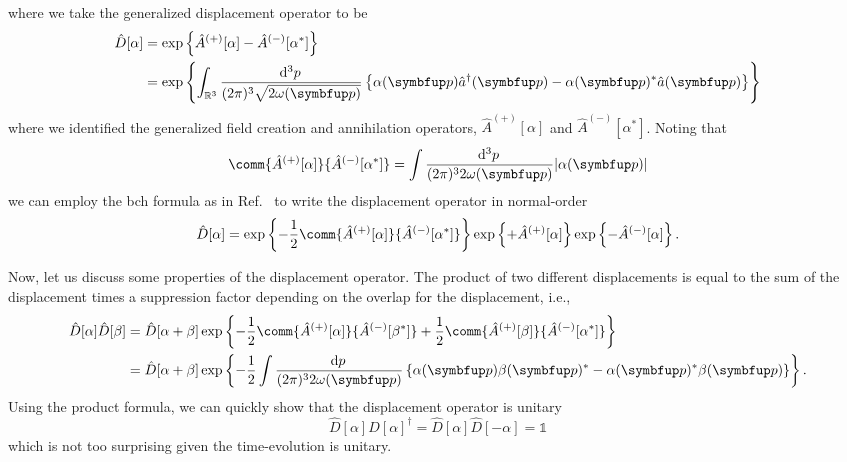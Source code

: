 where we take the generalized displacement operator to be
\begin{equation}
	\begin{split}
		\hat{D}[\alpha]
		&=
		\exp\left\{
			\hat{A}^{(+)}[\alpha]
			-
			\hat{A}^{(-)}[\alpha^*]
		\right\}
		\\
		&=
		\exp\left\{
			\int_{\mathbb{R}^3}\frac{\dd[3]{p}}{(2\pi) ^3\sqrt{2\omega(\vb{p})}}
			\left\{
				\alpha(\vb{p})
				\hat{a}^\dagger(\vb{p})
				-
				\alpha(\vb{p})^*
				\hat{a}(\vb{p})
			\right\}
		\right\}
	\end{split}
	\label{eq:displacement_operator}
\end{equation}
where we identified the generalized field creation and annihilation operators, $\hat{A}^{(+)}[\alpha]$ and $\hat{A}^{(-)}[\alpha^*]$.
Noting that
\begin{equation}
	\comm{\hat{A}^{(+)}[\alpha]}{\hat{A}^{(-)}[\alpha^*]}
	=
	\int\frac{\dd[3]{p}}{(2\pi)^32\omega(\vb{p})}
	\abs*{\alpha(\vb{p})}
\end{equation}
we can employ the \gls{bch} formula as in Ref.~\cite[p.~xx]{Barnett2002} to write the displacement operator in normal-order
\begin{equation}
	\hat{D}[\alpha]
	=
	\exp\left\{
		-
		\frac{1}{2}
		\comm{\hat{A}^{(+)}[\alpha]}{\hat{A}^{(-)}[\alpha^*]}
	\right\}
	\exp\left\{
		+
		\hat{A}^{(+)}[\alpha]
	\right\}
	\exp\left\{
		-
		\hat{A}^{(-)}[\alpha]
	\right\}
	.
\end{equation}

Now, let us discuss some properties of the displacement operator.
The product of two different displacements is equal to the sum of the displacement times a suppression factor depending on the overlap for the displacement, i.e.,
\begin{equation}
	\begin{split}
		\hat{D}[\alpha]
		\hat{D}[\beta]
		&=
		\hat{D}[\alpha+\beta]
		\exp\left\{
			-
			\frac{1}{2}
			\comm{\hat{A}^{(+)}[\alpha]}{\hat{A}^{(-)}[\beta^*]}
			+
			\frac{1}{2}
			\comm{\hat{A}^{(+)}[\beta]}{\hat{A}^{(-)}[\alpha^*]}
		\right\}
		\\
		&=
		\hat{D}[\alpha+\beta]
		\exp\left\{
			-
			\frac{1}{2}
			\int\frac{\dd{p}}{(2\pi)^32\omega(\vb{p})}
			\left\{
				\alpha(\vb{p})
				\beta(\vb{p})^*
				-
				\alpha(\vb{p})^*
				\beta(\vb{p})
			\right\}
		\right\}
		.
	\end{split}
\end{equation}
Using the product formula, we can quickly show that the displacement operator is unitary
\begin{equation}
	\hat{D}[\alpha]
	\hat{D}[\alpha]^\dagger
	=
	\hat{D}[\alpha]
	\hat{D}[-\alpha]
	=
	\mathbb{1}
\end{equation}
which is not too surprising given the time-evolution is unitary.

